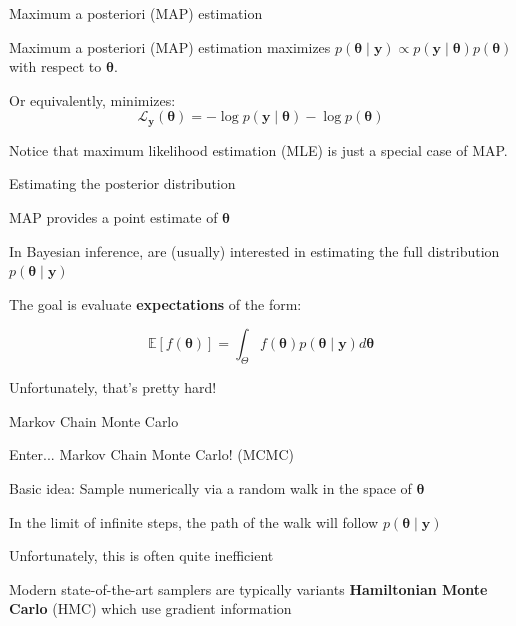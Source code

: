 \documentclass[12pt,aspectratio=169]{beamer}
\begin{document}
\begin{frame}{Maximum a posteriori (MAP) estimation}

Maximum a posteriori (MAP) estimation maximizes $p(\boldsymbol{\theta}  \mid  \mathbf{y}) \propto p(\mathbf{y}  \mid  \boldsymbol{\theta})p(\boldsymbol{\theta})$ with respect to $\boldsymbol{\theta}$.
\pause\newline

Or equivalently, minimizes:
$$
\mathcal{L}_{\mathbf{y}}(\boldsymbol{\theta}) = -\log p(\mathbf{y} \mid \boldsymbol{\theta}) - \log p(\boldsymbol{\theta})
$$
\pause\newline

Notice that maximum likelihood estimation (MLE) is just a special case of MAP.


\end{frame}

\begin{frame}{Estimating the posterior distribution}


MAP provides a point estimate of $\boldsymbol{\theta}$
\pause\newline

In Bayesian inference, are (usually) interested in estimating the full distribution $p(\boldsymbol{\theta} \mid \mathbf{y})$
\pause\newline

The goal is evaluate \textbf{expectations} of the form:

$$
\mathbb{E}[f(\boldsymbol{\theta})] = \int_\Theta f(\boldsymbol{\theta})p(\boldsymbol{\theta} \mid \mathbf{y})d\boldsymbol{\theta}
$$

Unfortunately, that's pretty hard!

\end{frame}

\begin{frame}{Markov Chain Monte Carlo}


Enter... Markov Chain Monte Carlo! (MCMC)
\pause\newline

Basic idea: Sample numerically via a random walk in the space of $\boldsymbol{\theta}$
\pause\newline

In the limit of infinite steps, the path of the walk will follow $p(\boldsymbol{\theta} \mid \mathbf{y})$
\pause\newline

Unfortunately, this is often quite inefficient
\pause\newline

Modern state-of-the-art samplers are typically variants \textbf{Hamiltonian Monte Carlo} (HMC) which use gradient information


\end{frame}
\end{document}
